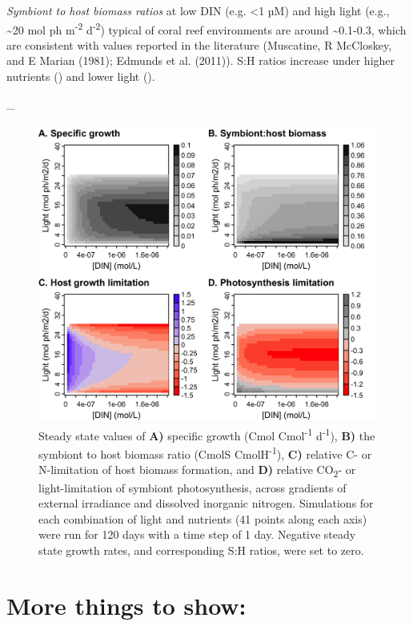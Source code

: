 \documentclass[]{elsarticle} %
\makeatletter
\def\maxwidth{\ifdim\Gin@nat@width>\linewidth\linewidth
\else\Gin@nat@width\fi}
\let\Oldincludegraphics\includegraphics
\renewcommand{\includegraphics}[1]{\Oldincludegraphics[width=\maxwidth]{#1}}
\makeatother
\begin{document}
\emph{Symbiont to host biomass ratios} at low DIN (e.g. \textless{}1 µM)
and high light (e.g., \textasciitilde{}20 mol ph m\textsuperscript{-2}
d\textsuperscript{-2}) typical of coral reef environments are around
\textasciitilde{}0.1-0.3, which are consistent with values reported in
the literature (Muscatine, R McCloskey, and E Marian (1981); Edmunds et
al. (2011)). S:H ratios increase under higher nutrients () and lower
light ().

\_

\begin{figure}[htbp]
\centering
\includegraphics{../img/Fig2.png}
\caption{Steady state values of \textbf{A)} specific growth (Cmol
Cmol\textsuperscript{-1} d\textsuperscript{-1}), \textbf{B)} the
symbiont to host biomass ratio (CmolS CmolH\textsuperscript{-1}),
\textbf{C)} relative C- or N-limitation of host biomass formation, and
\textbf{D)} relative CO\textsubscript{2}- or light-limitation of
symbiont photosynthesis, across gradients of external irradiance and
dissolved inorganic nitrogen. Simulations for each combination of light
and nutrients (41 points along each axis) were run for 120 days with a
time step of 1 day. Negative steady state growth rates, and
corresponding S:H ratios, were set to zero.}
\end{figure}

\section{More things to show:}\label{more-things-to-show}
\end{document}

